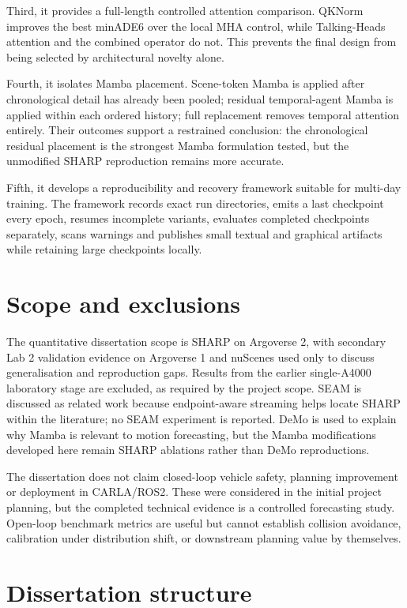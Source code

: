 Third, it provides a full-length controlled attention comparison. QKNorm improves the best minADE6 over the local MHA control, while Talking-Heads attention and the combined operator do not. This prevents the final design from being selected by architectural novelty alone.

Fourth, it isolates Mamba placement. Scene-token Mamba is applied after chronological detail has already been pooled; residual temporal-agent Mamba is applied within each ordered history; full replacement removes temporal attention entirely. Their outcomes support a restrained conclusion: the chronological residual placement is the strongest Mamba formulation tested, but the unmodified SHARP reproduction remains more accurate.

Fifth, it develops a reproducibility and recovery framework suitable for multi-day training. The framework records exact run directories, emits a last checkpoint every epoch, resumes incomplete variants, evaluates completed checkpoints separately, scans warnings and publishes small textual and graphical artifacts while retaining large checkpoints locally.

\section{Scope and exclusions}

The quantitative dissertation scope is SHARP on Argoverse 2, with secondary Lab 2 validation evidence on Argoverse 1 and nuScenes used only to discuss generalisation and reproduction gaps. Results from the earlier single-A4000 laboratory stage are excluded, as required by the project scope. SEAM is discussed as related work because endpoint-aware streaming helps locate SHARP within the literature; no SEAM experiment is reported. DeMo is used to explain why Mamba is relevant to motion forecasting, but the Mamba modifications developed here remain SHARP ablations rather than DeMo reproductions.

The dissertation does not claim closed-loop vehicle safety, planning improvement or deployment in CARLA/ROS2. These were considered in the initial project planning, but the completed technical evidence is a controlled forecasting study. Open-loop benchmark metrics are useful but cannot establish collision avoidance, calibration under distribution shift, or downstream planning value by themselves.

\section{Dissertation structure}

